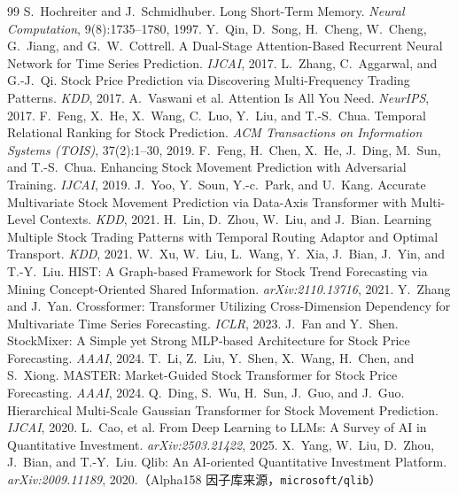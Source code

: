 \documentclass[a4paper,11pt,fontset=fandol]{ctexart}
\begin{document}
\begin{thebibliography}{99}
\small
{} S.~Hochreiter and J.~Schmidhuber. Long Short-Term Memory. \emph{Neural Computation}, 9(8):1735--1780, 1997.
 Y.~Qin, D.~Song, H.~Cheng, W.~Cheng, G.~Jiang, and G.~W.~Cottrell. A Dual-Stage Attention-Based Recurrent Neural Network for Time Series Prediction. \emph{IJCAI}, 2017.
 L.~Zhang, C.~Aggarwal, and G.-J.~Qi. Stock Price Prediction via Discovering Multi-Frequency Trading Patterns. \emph{KDD}, 2017.
 A.~Vaswani et al. Attention Is All You Need. \emph{NeurIPS}, 2017.
 F.~Feng, X.~He, X.~Wang, C.~Luo, Y.~Liu, and T.-S.~Chua. Temporal Relational Ranking for Stock Prediction. \emph{ACM Transactions on Information Systems (TOIS)}, 37(2):1--30, 2019.
 F.~Feng, H.~Chen, X.~He, J.~Ding, M.~Sun, and T.-S.~Chua. Enhancing Stock Movement Prediction with Adversarial Training. \emph{IJCAI}, 2019.
 J.~Yoo, Y.~Soun, Y.-c.~Park, and U.~Kang. Accurate Multivariate Stock Movement Prediction via Data-Axis Transformer with Multi-Level Contexts. \emph{KDD}, 2021.
 H.~Lin, D.~Zhou, W.~Liu, and J.~Bian. Learning Multiple Stock Trading Patterns with Temporal Routing Adaptor and Optimal Transport. \emph{KDD}, 2021.
 W.~Xu, W.~Liu, L.~Wang, Y.~Xia, J.~Bian, J.~Yin, and T.-Y.~Liu. HIST: A Graph-based Framework for Stock Trend Forecasting via Mining Concept-Oriented Shared Information. \emph{arXiv:2110.13716}, 2021.
 Y.~Zhang and J.~Yan. Crossformer: Transformer Utilizing Cross-Dimension Dependency for Multivariate Time Series Forecasting. \emph{ICLR}, 2023.
 J.~Fan and Y.~Shen. StockMixer: A Simple yet Strong MLP-based Architecture for Stock Price Forecasting. \emph{AAAI}, 2024.
 T.~Li, Z.~Liu, Y.~Shen, X.~Wang, H.~Chen, and S.~Xiong. MASTER: Market-Guided Stock Transformer for Stock Price Forecasting. \emph{AAAI}, 2024.
 Q.~Ding, S.~Wu, H.~Sun, J.~Guo, and J.~Guo. Hierarchical Multi-Scale Gaussian Transformer for Stock Movement Prediction. \emph{IJCAI}, 2020.
 L.~Cao, et al. From Deep Learning to LLMs: A Survey of AI in Quantitative Investment. \emph{arXiv:2503.21422}, 2025.
 X.~Yang, W.~Liu, D.~Zhou, J.~Bian, and T.-Y.~Liu. Qlib: An AI-oriented Quantitative Investment Platform. \emph{arXiv:2009.11189}, 2020.（Alpha158 因子库来源，\texttt{microsoft/qlib}）
\end{thebibliography}
\end{document}
